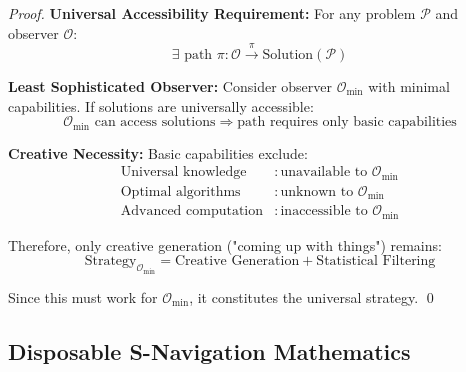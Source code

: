 \documentclass[12pt,a4paper]{article}
\begin{document}
\begin{proof}
\textbf{Universal Accessibility Requirement:}
For any problem $\mathcal{P}$ and observer $\mathcal{O}$:
\begin{equation}
\exists \text{ path } \pi : \mathcal{O} \stackrel{\pi}{\longrightarrow} \text{Solution}(\mathcal{P})
\end{equation}

\textbf{Least Sophisticated Observer:}
Consider observer $\mathcal{O}_{\text{min}}$ with minimal capabilities. If solutions are universally accessible:
\begin{equation}
\mathcal{O}_{\text{min}} \text{ can access solutions} \Rightarrow \text{path requires only basic capabilities}
\end{equation}

\textbf{Creative Necessity:}
Basic capabilities exclude:
\begin{align}
\text{Universal knowledge} &: \text{unavailable to } \mathcal{O}_{\text{min}} \\
\text{Optimal algorithms} &: \text{unknown to } \mathcal{O}_{\text{min}} \\
\text{Advanced computation} &: \text{inaccessible to } \mathcal{O}_{\text{min}}
\end{align}

Therefore, only creative generation ("coming up with things") remains:
\begin{equation}
\text{Strategy}_{\mathcal{O}_{\text{min}}} = \text{Creative Generation} + \text{Statistical Filtering}
\end{equation}

Since this must work for $\mathcal{O}_{\text{min}}$, it constitutes the universal strategy. \qed
\end{proof}

\subsection{Disposable S-Navigation Mathematics}
\end{document}
